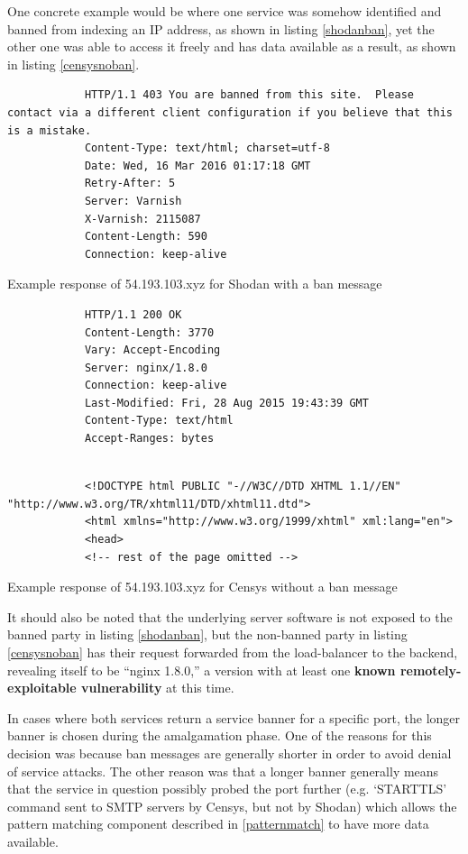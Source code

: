 \documentclass[a4paper,12pt]{article}
\begin{document}
	One concrete example would be where one service was somehow identified and banned from indexing an IP address, as shown in listing \ref{shodanban}, yet the other one was able to access it freely and has data available as a result, as shown in listing \ref{censysnoban}.
	
	\begin{listing}[H]
		\begin{verbatim}
			HTTP/1.1 403 You are banned from this site.  Please contact via a different client configuration if you believe that this is a mistake.
			Content-Type: text/html; charset=utf-8
			Date: Wed, 16 Mar 2016 01:17:18 GMT
			Retry-After: 5
			Server: Varnish
			X-Varnish: 2115087
			Content-Length: 590
			Connection: keep-alive
		\end{verbatim}
		\caption{Example response of 54.193.103.xyz for Shodan with a ban message}
		\label{shodanban}
	\end{listing}
		
	\begin{listing}[H]
		\begin{verbatim}
			HTTP/1.1 200 OK
			Content-Length: 3770
			Vary: Accept-Encoding
			Server: nginx/1.8.0
			Connection: keep-alive
			Last-Modified: Fri, 28 Aug 2015 19:43:39 GMT
			Content-Type: text/html
			Accept-Ranges: bytes
		\end{verbatim}
		\vspace{-5pt}
		\begin{verbatim}
			 
			<!DOCTYPE html PUBLIC "-//W3C//DTD XHTML 1.1//EN" "http://www.w3.org/TR/xhtml11/DTD/xhtml11.dtd">
			<html xmlns="http://www.w3.org/1999/xhtml" xml:lang="en">
			<head>
			<!-- rest of the page omitted -->
		\end{verbatim}
		\caption{Example response of 54.193.103.xyz for Censys without a ban message}
		\label{censysnoban}
	\end{listing}

	It should also be noted that the underlying server software is not exposed to the banned party in listing \ref{shodanban}, but the non-banned party in listing \ref{censysnoban} has their request forwarded from the load-balancer to the backend, revealing itself to be ``nginx 1.8.0,'' a version with at least one \textbf{known remotely-exploitable vulnerability}\cite{nginxcve} at this time.

	In cases where both services return a service banner for a specific port, the longer banner is chosen during the amalgamation phase. One of the reasons for this decision was because ban messages are generally shorter\cite{qualys11} in order to avoid denial of service attacks. The other reason was that a longer banner generally means that the service in question possibly probed the port further (e.g. `STARTTLS' command sent to SMTP servers by Censys, but not by Shodan) which allows the pattern matching component described in \ref{patternmatch} to have more data available.
\end{document}
